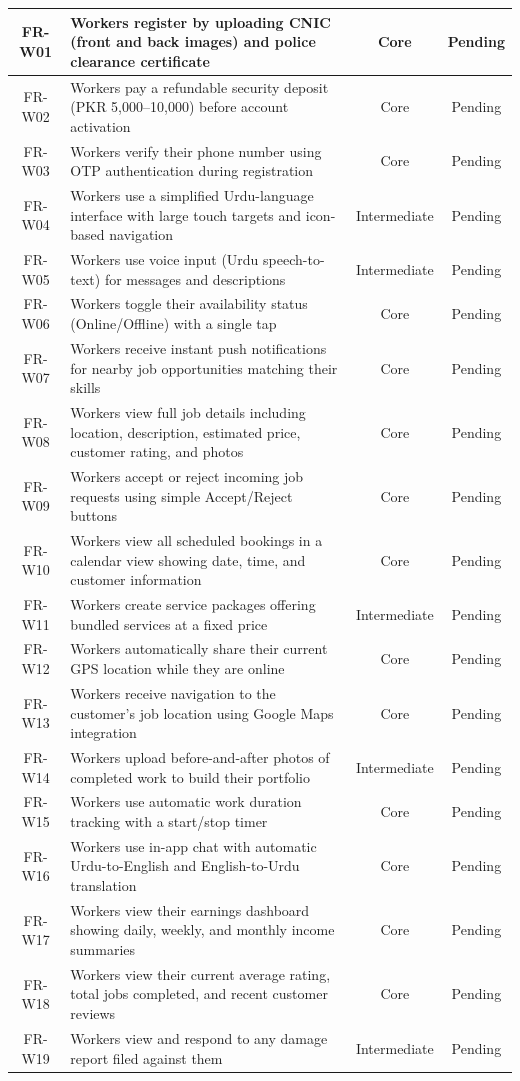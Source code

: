 \documentclass[12pt,a4paper]{report}
\begin{document}
\begin{longtable}{|c|p{9.5cm}|c|c|}
\hline
FR-W01 & Workers register by uploading CNIC (front and back images) and police clearance certificate & Core & Pending \\
\hline
FR-W02 & Workers pay a refundable security deposit (PKR 5,000--10,000) before account activation & Core & Pending \\
\hline
FR-W03 & Workers verify their phone number using OTP authentication during registration & Core & Pending \\
\hline
FR-W04 & Workers use a simplified Urdu-language interface with large touch targets and icon-based navigation & Intermediate & Pending \\
\hline
FR-W05 & Workers use voice input (Urdu speech-to-text) for messages and descriptions & Intermediate & Pending \\
\hline
FR-W06 & Workers toggle their availability status (Online/Offline) with a single tap & Core & Pending \\
\hline
FR-W07 & Workers receive instant push notifications for nearby job opportunities matching their skills & Core & Pending \\
\hline
FR-W08 & Workers view full job details including location, description, estimated price, customer rating, and photos & Core & Pending \\
\hline
FR-W09 & Workers accept or reject incoming job requests using simple Accept/Reject buttons & Core & Pending \\
\hline
FR-W10 & Workers view all scheduled bookings in a calendar view showing date, time, and customer information & Core & Pending \\
\hline
FR-W11 & Workers create service packages offering bundled services at a fixed price & Intermediate & Pending \\
\hline
FR-W12 & Workers automatically share their current GPS location while they are online & Core & Pending \\
\hline
FR-W13 & Workers receive navigation to the customer's job location using Google Maps integration & Core & Pending \\
\hline
FR-W14 & Workers upload before-and-after photos of completed work to build their portfolio & Intermediate & Pending \\
\hline
FR-W15 & Workers use automatic work duration tracking with a start/stop timer & Core & Pending \\
\hline
FR-W16 & Workers use in-app chat with automatic Urdu-to-English and English-to-Urdu translation & Core & Pending \\
\hline
FR-W17 & Workers view their earnings dashboard showing daily, weekly, and monthly income summaries & Core & Pending \\
\hline
FR-W18 & Workers view their current average rating, total jobs completed, and recent customer reviews & Core & Pending \\
\hline
FR-W19 & Workers view and respond to any damage report filed against them & Intermediate & Pending \\
\hline


\end{longtable}
\end{document}
